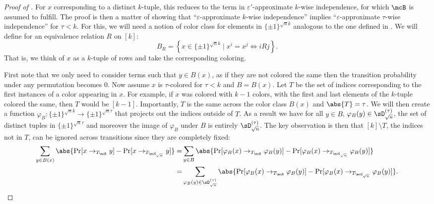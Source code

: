 \begin{proof}[Proof of ]
For $x$ corresponding to a distinct $k$-tuple, this reduces to the term in $\varepsilon'$-approximate $k$-wise independence, for which $\mcB$ is assumed to fulfill. The proof is then a matter of showing that ``$\varepsilon$-approximate $k$-wise independence'' implies ``$\varepsilon$-approximate $\tau$-wise independence'' for $\tau < k$. For this, we will need a notion of color class for elements in $\{\pm1\}^{\sqrt{n}k}$ analogous to the one defined in . We will define for an equivalence relation $R$ on $[k]$:
\begin{equation*}
    B_R = \left\{x \in \{\pm1\}^{\sqrt{n}k} \mid x^i = x^j \iff i R j\right\}.
\end{equation*}
That is, we think of $x$ as a $k$-tuple of rows and take the corresponding coloring.

First note that we only need to consider terms such that $y \in B(x)$, as if they are not colored the same then the transition probability under any permutation becomes 0. Now assume $x$ is $\tau$-colored for $\tau < k$ and $B = B(x)$. Let $T$ be the set of indices corresponding to the first instances of a color appearing in $x$. For example, if $x$ was colored with $k-1$ colors, with the first and last elements of the $k$-tuple colored the same, then $T$ would be $[k-1]$. Importantly, $T$ is the same across the color class $B(x)$ and $\abs{T} = \tau$. We will then create a function $\varphi_B : \{\pm1\}^{\sqrt{n}k} \to \{\pm1\}^{\sqrt{n}\tau}$ that projects out the indices outside of $T$. As a result we have for all $y \in B$, $\varphi_B(y) \in \sD_{\sqrt{n}}^{(\tau)}$, the set of distinct tuples in $\{\pm1\}^{\sqrt{n}\tau}$ and moreover the image of $\varphi_B$ under $B$ is entirely $\sD_{\sqrt{n}}^{(\tau)}$. The key observation is then that $[k] \setminus T$, the indices not in $T$, can be ignored across transitions since they are completely fixed:
\begin{align*}
    \sum_{y \in B(x)} \abs{\Pr[x \to_{T_\mcB} y] - \Pr[x \to_{T_{\mcG_{\sqrt{n}}}} y]} =& \sum_{y \in B} \abs{\Pr[\varphi_B(x) \to_{T_\mcB} \varphi_B(y)] - \Pr[\varphi_B(x) \to_{T_{\mcG_{\sqrt{n}}}} \varphi_B(y)]}\\
    =& \sum_{\varphi_B(y) \in \sD_{\sqrt{n}}^{(\tau)}} \abs{\Pr[\varphi_B(x) \to_{T_\mcB} \varphi_B(y)] - \Pr[\varphi_B(x) \to_{T_{\mcG_{\sqrt{n}}}} \varphi_B(y)]}.
\end{align*}


\end{proof}

